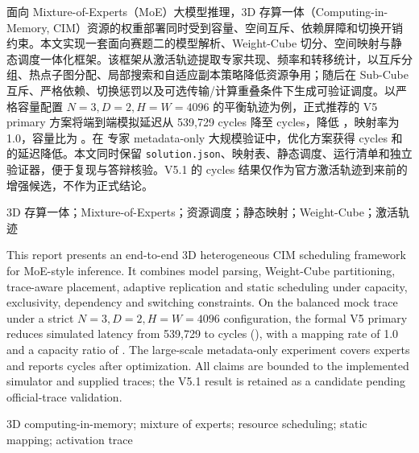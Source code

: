 \noindent{}\quad
面向 Mixture-of-Experts（MoE）大模型推理，3D 存算一体（Computing-in-Memory, CIM）资源的权重部署同时受到容量、空间互斥、依赖屏障和切换开销约束。本文实现一套面向赛题二的模型解析、Weight-Cube 切分、空间映射与静态调度一体化框架。该框架从激活轨迹提取专家共现、频率和转移统计，以互斥分组、热点子图分配、局部搜索和自适应副本策略降低资源争用；随后在 Sub-Cube 互斥、严格依赖、切换惩罚以及可选传输/计算重叠条件下生成可验证调度。以严格容量配置 $N=3,D=2,H=W=4096$ 的平衡轨迹为例，正式推荐的 V5 primary 方案将端到端模拟延迟从 539,729 cycles 降至 \PrimaryLatency{} cycles，降低 \PrimaryImprovement{}，映射率为 1.0，容量比为 \PrimaryCapacity{}。在 \LargeExperts{} 专家 metadata-only 大规模验证中，优化方案获得 \LargeLatency{} cycles 和 \LargeImprovement{} 的延迟降低。本文同时保留 \texttt{solution.json}、映射表、静态调度、运行清单和独立验证器，便于复现与答辩核验。V5.1 的 \CandidateLatency{} cycles 结果仅作为官方激活轨迹到来前的增强候选，不作为正式结论。

\noindent{}\quad 3D 存算一体；Mixture-of-Experts；资源调度；静态映射；Weight-Cube；激活轨迹

\vspace{1mm}
\noindent{}\quad
This report presents an end-to-end 3D heterogeneous CIM scheduling framework for MoE-style inference. It combines model parsing, Weight-Cube partitioning, trace-aware placement, adaptive replication and static scheduling under capacity, exclusivity, dependency and switching constraints. On the balanced mock trace under a strict $N=3,D=2,H=W=4096$ configuration, the formal V5 primary reduces simulated latency from 539,729 to \PrimaryLatency{} cycles (\PrimaryImprovement{}), with a mapping rate of 1.0 and a capacity ratio of \PrimaryCapacity{}. The large-scale metadata-only experiment covers \LargeExperts{} experts and reports \LargeLatency{} cycles after optimization. All claims are bounded to the implemented simulator and supplied traces; the V5.1 result is retained as a candidate pending official-trace validation.

\noindent{}\quad 3D computing-in-memory; mixture of experts; resource scheduling; static mapping; activation trace
